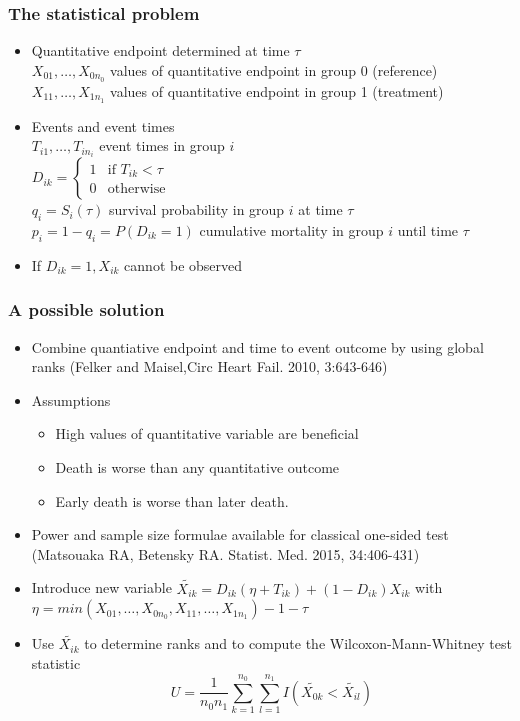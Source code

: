 \documentclass[xcolor=pdftex,dvipsnames,table]{beamer}\usepackage[]{graphicx}\usepackage[]{color}
\begin{document}
\begin{frame}[label = slide3] %
\frametitle{The statistical problem}
	\begin{itemize}
		\item Quantitative endpoint determined at time $\tau$ \\
    $X_{01}, \ldots, X_{0n_0}$  values of quantitative endpoint in group 0 (reference)\\
    $X_{11}, \ldots, X_{1n_1}$  values of quantitative endpoint in group 1 (treatment) \\
		\item Events and event times \\
		$T_{i1}, \ldots, T_{in_i}$  event times in group $i$ \\
    $D_{ik} = \begin{cases} 1 & \mbox{if } T_{ik} < \tau \\
                            0 & \mbox{otherwise} 
              \end{cases}$ \\
		$q_i = S_i(\tau) $  survival probability in group $i$ at time $\tau$ \\
		$p_i = 1 - q_i = P(D_{ik} = 1)$  cumulative mortality in group $i$ until time $\tau$ \\
		\item If $D_{ik} = 1, X_{ik}$ cannot be observed
\end{itemize}
\end{frame}

\begin{frame}[label = slide4] %
\frametitle{A possible solution}
	\begin{itemize}
		\item Combine quantiative endpoint and time to event outcome by using global ranks
          (Felker and Maisel,Circ Heart Fail. 2010, 3:643-646)
		\item Assumptions
		\begin{itemize} 
		  \item High values of quantitative variable are beneficial
		  \item Death is worse than any quantitative outcome
		  \item Early death is worse than later death.
	\end{itemize}
	\item Power and sample size formulae available for classical one-sided test
        (Matsouaka RA, Betensky RA. Statist. Med. 2015, 34:406-431)
	\item Introduce new variable 
	     $\tilde{X_{ik}} = D_{ik}(\eta  + T_{ik}) + (1 - D_{ik})X_{ik}$ with \\
	     $\eta = min(X_{01}, \ldots, X_{0n_0}, X_{11}, \ldots, X_{1n_1}) - 1 - \tau$
	\item Use $\tilde{X_{ik}}$ to determine ranks and to compute the Wilcoxon-Mann-Whitney test statistic \\
  $$ U = \frac{1}{n_0 n_1} \sum_{k=1}^{n_0} \sum_{l=1}^{n_1}I(\tilde{X_{0k}} < \tilde{X_{il}}) $$
\end{itemize}
\end{frame}
\end{document}
